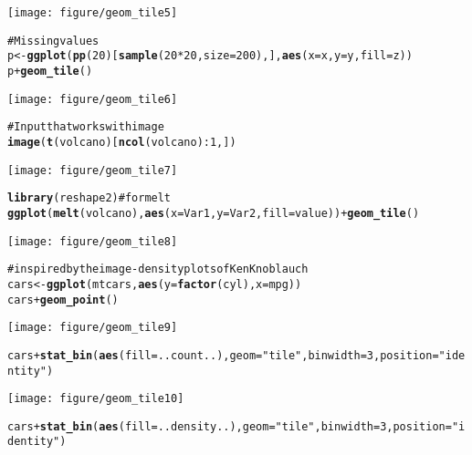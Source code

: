 \documentclass[a4paper,titlepage]{tufte-handout}\usepackage{graphicx, color}
\makeatletter
\def\maxwidth{ %
  \ifdim\Gin@nat@width>\linewidth
    \linewidth
  \else
    \Gin@nat@width
  \fi
}
\newcommand{\hlfunctioncall}[1]{\textcolor[rgb]{0.501960784313725,0,0.329411764705882}{\textbf{#1}}}%
\newcommand{\hlstring}[1]{\textcolor[rgb]{0.6,0.6,1}{#1}}%
\newcommand{\hlcomment}[1]{\textcolor[rgb]{0.180392156862745,0.6,0.341176470588235}{#1}}%
\newenvironment{kframe}{%
 \def\at@end@of@kframe{}%
 \ifinner\ifhmode%
  \def\at@end@of@kframe{\end{minipage}}%
  \begin{minipage}{\columnwidth}%
 \fi\fi%
 \def\FrameCommand##1{\hskip\@totalleftmargin \hskip-\fboxsep
 \colorbox{shadecolor}{##1}\hskip-\fboxsep
     \hskip-\linewidth \hskip-\@totalleftmargin \hskip\columnwidth}%
 \MakeFramed {\advance\hsize-\width
   \@totalleftmargin\z@ \linewidth\hsize
   \@setminipage}}%
 {\par\unskip\endMakeFramed%
 \at@end@of@kframe}
\newenvironment{knitrout}{}{} %
\makeatother
\begin{document}
\begin{knitrout}
\begin{kframe}
\begin{alltt}
\end{alltt}
\end{kframe}\texttt{[image: figure/geom\_tile5]} \begin{kframe}\begin{alltt}
\hlcomment{# Missing values}
p <- \hlfunctioncall{ggplot}(\hlfunctioncall{pp}(20)[\hlfunctioncall{sample}(20*20, size=200),], \hlfunctioncall{aes}(x=x,y=y,fill=z))
p + \hlfunctioncall{geom_tile}()
\end{alltt}
\end{kframe}\texttt{[image: figure/geom\_tile6]} \begin{kframe}\begin{alltt}
\hlcomment{# Input that works with image}
\hlfunctioncall{image}(\hlfunctioncall{t}(volcano)[\hlfunctioncall{ncol}(volcano):1,])
\end{alltt}
\end{kframe}\texttt{[image: figure/geom\_tile7]} \begin{kframe}\begin{alltt}
\hlfunctioncall{library}(reshape2) \hlcomment{# for melt}
\hlfunctioncall{ggplot}(\hlfunctioncall{melt}(volcano), \hlfunctioncall{aes}(x=Var1, y=Var2, fill=value)) + \hlfunctioncall{geom_tile}()
\end{alltt}
\end{kframe}\texttt{[image: figure/geom\_tile8]} \begin{kframe}\begin{alltt}
\hlcomment{# inspired by the image-density plots of Ken Knoblauch}
cars <- \hlfunctioncall{ggplot}(mtcars, \hlfunctioncall{aes}(y=\hlfunctioncall{factor}(cyl), x=mpg))
cars + \hlfunctioncall{geom_point}()
\end{alltt}
\end{kframe}\texttt{[image: figure/geom\_tile9]} \begin{kframe}\begin{alltt}
cars + \hlfunctioncall{stat_bin}(\hlfunctioncall{aes}(fill=..count..), geom=\hlstring{"tile"}, binwidth=3, position=\hlstring{"identity"})
\end{alltt}
\end{kframe}\texttt{[image: figure/geom\_tile10]} \begin{kframe}\begin{alltt}
cars + \hlfunctioncall{stat_bin}(\hlfunctioncall{aes}(fill=..density..), geom=\hlstring{"tile"}, binwidth=3, position=\hlstring{"identity"})
\end{alltt}

\end{kframe}
\end{knitrout}
\end{document}
